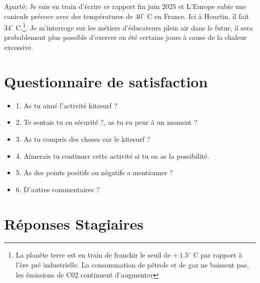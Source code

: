 \documentclass[11pt,a4paper]{report}
\begin{document}
Aparté: Je suis en train d'écrire ce rapport fin juin 2025 et L’Europe subie
une canicule précoce avec des températures de $40^{\circ}$ C en France. Ici à Hourtin, 
il fait $34^{\circ}$ C.\footnote{
La planète terre est en train de franchir le seuil  de  $+\, 1.5^{\circ}$ C par rapport
 à l'ère pré industrielle. La consommation de pétrole et de gaz ne baissent pas, les 
émissions de C02 continuent d'augmenter\cite{giec}}.
Je m'interroge sur les métiers d'éducateurs plein air dans le futur, il sera
probablement plus possible d'exercer en été certains jours
à cause de la chaleur excessive.

\appendix
\appendixpage
\addappheadtotoc
\chapter{Questionnaire de satisfaction\label{questionnaire}}
\begin{itemize}
\item 1. As tu aimé l'activité kitesurf ?
\item 2. Te sentais tu en sécurité ?, as tu eu peur à un moment ?
\item 3. As tu compris des choses sur le kitesurf ?
\item 4. Aimerais tu continuer cette activité si tu en as la possibilité.
\item 5. As des points positifs ou négatifs a mentionner ?
\item 6. D'autres commentaires ?
\end{itemize}

\chapter{Réponses Stagiaires\label{reponses}}
\end{document}
